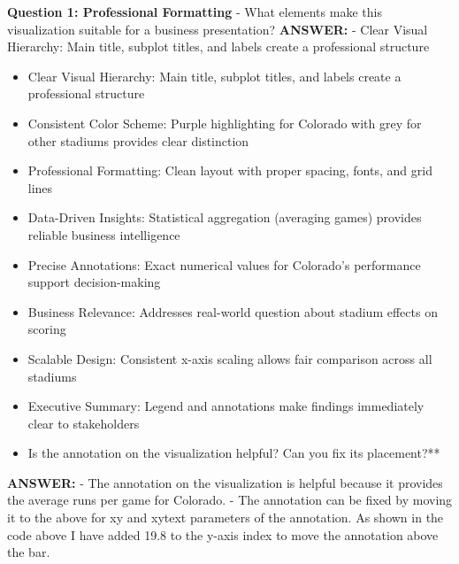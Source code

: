 \documentclass[
  letterpaper,
  DIV=11,
  numbers=noendperiod]{scrartcl}
\begin{document}
\begin{tcolorbox}[enhanced jigsaw, rightrule=.15mm, coltitle=black, colbacktitle=quarto-callout-important-color!10!white, opacitybacktitle=0.6, arc=.35mm, leftrule=.75mm, colback=white, title=\textcolor{quarto-callout-important-color}{\faExclamation}\hspace{0.5em}{🤔 Discussion Questions: Stage 4 - Formatting for Your Audience}, colframe=quarto-callout-important-color-frame, bottomrule=.15mm, left=2mm, opacityback=0, toptitle=1mm, titlerule=0mm, toprule=.15mm, bottomtitle=1mm, breakable]

\textbf{Question 1: Professional Formatting} - What elements make this
visualization suitable for a business presentation? \textbf{ANSWER:} -
Clear Visual Hierarchy: Main title, subplot titles, and labels create a
professional structure

\begin{itemize}
\item
  Clear Visual Hierarchy: Main title, subplot titles, and labels create
  a professional structure
\item
  Consistent Color Scheme: Purple highlighting for Colorado with grey
  for other stadiums provides clear distinction
\item
  Professional Formatting: Clean layout with proper spacing, fonts, and
  grid lines
\item
  Data-Driven Insights: Statistical aggregation (averaging games)
  provides reliable business intelligence
\item
  Precise Annotations: Exact numerical values for Colorado's performance
  support decision-making
\item
  Business Relevance: Addresses real-world question about stadium
  effects on scoring
\item
  Scalable Design: Consistent x-axis scaling allows fair comparison
  across all stadiums
\item
  Executive Summary: Legend and annotations make findings immediately
  clear to stakeholders
\item
  Is the annotation on the visualization helpful? Can you fix its
  placement?**
\end{itemize}

\textbf{ANSWER:} - The annotation on the visualization is helpful
because it provides the average runs per game for Colorado. - The
annotation can be fixed by moving it to the above for xy and xytext
parameters of the annotation. As shown in the code above I have added
19.8 to the y-axis index to move the annotation above the bar.

\end{tcolorbox}
\end{document}
